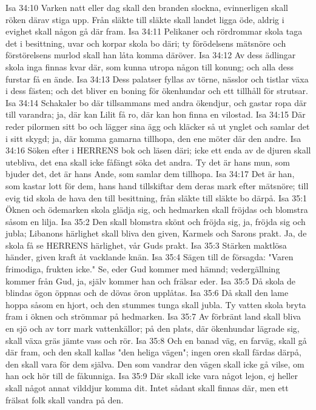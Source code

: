 Isa 34:10  Varken natt eller dag skall den branden slockna, evinnerligen skall röken därav stiga upp. Från släkte till släkte skall landet ligga öde, aldrig i evighet skall någon gå där fram.
Isa 34:11  Pelikaner och rördrommar skola taga det i besittning, uvar och korpar skola bo däri; ty förödelsens mätsnöre och förstörelsens murlod skall han låta komma däröver.
Isa 34:12  Av dess ädlingar skola inga finnas kvar där, som kunna utropa någon till konung; och alla dess furstar få en ände.
Isa 34:13  Dess palatser fyllas av törne, nässlor och tistlar växa i dess fästen; och det bliver en boning för ökenhundar och ett tillhåll för strutsar.
Isa 34:14  Schakaler bo där tillsammans med andra ökendjur, och gastar ropa där till varandra; ja, där kan Lilit få ro, där kan hon finna en vilostad.
Isa 34:15  Där reder pilormen sitt bo och lägger sina ägg och kläcker så ut ynglet och samlar det i sitt skygd; ja, där komma gamarna tillhopa, den ene möter där den andre.
Isa 34:16  Söken efter i HERRENS bok och läsen däri; icke ett enda av de djuren skall utebliva, det ena skall icke fåfängt söka det andra. Ty det är hans mun, som bjuder det, det är hans Ande, som samlar dem tillhopa.
Isa 34:17  Det är han, som kastar lott för dem, hans hand tillskiftar dem deras mark efter mätsnöre; till evig tid skola de hava den till besittning, från släkte till släkte bo därpå.
Isa 35:1  Öknen och ödemarken skola glädja sig, och hedmarken skall fröjdas och blomstra såsom en lilja.
Isa 35:2  Den skall blomstra skönt och fröjda sig, ja, fröjda sig och jubla; Libanons härlighet skall bliva den given, Karmels och Sarons prakt. Ja, de skola få se HERRENS härlighet, vår Guds prakt.
Isa 35:3  Stärken maktlösa händer, given kraft åt vacklande knän.
Isa 35:4  Sägen till de försagda: "Varen frimodiga, frukten icke." Se, eder Gud kommer med hämnd; vedergällning kommer från Gud, ja, själv kommer han och frälsar eder.
Isa 35:5  Då skola de blindas ögon öppnas och de dövas öron upplåtas.
Isa 35:6  Då skall den lame hoppa såsom en hjort, och den stummes tunga skall jubla. Ty vatten skola bryta fram i öknen och strömmar på hedmarken.
Isa 35:7  Av förbränt land skall bliva en sjö och av torr mark vattenkällor; på den plats, där ökenhundar lägrade sig, skall växa gräs jämte vass och rör.
Isa 35:8  Och en banad väg, en farväg, skall gå där fram, och den skall kallas "den heliga vägen"; ingen oren skall färdas därpå, den skall vara för dem själva. Den som vandrar den vägen skall icke gå vilse, om han ock hör till de fåkunniga.
Isa 35:9  Där skall icke vara något lejon, ej heller skall något annat vilddjur komma dit. Intet sådant skall finnas där, men ett frälsat folk skall vandra på den.
